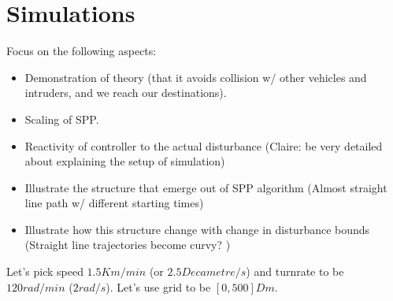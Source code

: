 \section{Simulations}

Focus on the following aspects:
\begin{itemize}
\item Demonstration of theory (that it avoids collision w/ other vehicles and intruders, and we reach our destinations).
\item Scaling of SPP.
\item Reactivity of controller to the actual disturbance (Claire: be very detailed about explaining the setup of simulation)
\item Illustrate the structure that emerge out of SPP algorithm (Almost straight line path w/ different starting times)
\item Illustrate how this structure change with change in disturbance bounds (Straight line trajectories become curvy? )
\end{itemize}


Let's pick speed $1.5 Km/min$ (or $2.5 Decametre/s$) and turnrate to be $120 rad/min$ ($2 rad/s$). Let's use grid to be $[0, 500] Dm$.

